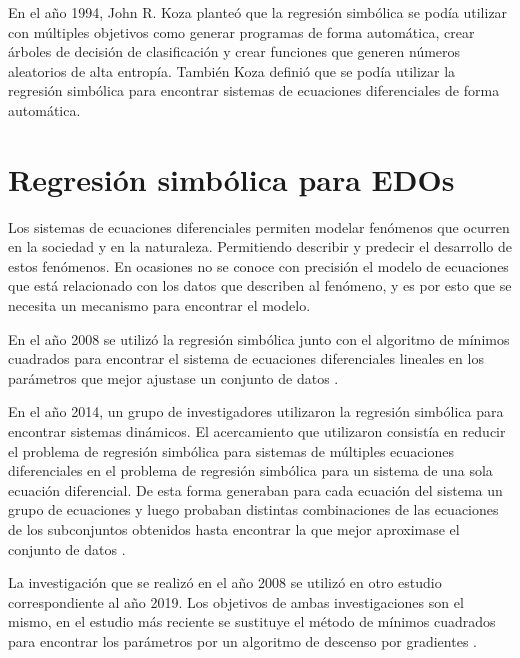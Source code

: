 En el año 1994, John R. Koza planteó que la regresión simbólica se podía utilizar con múltiples objetivos como generar programas de forma automática, crear árboles de decisión de clasificación y crear funciones que generen números aleatorios de alta entropía. También Koza definió que se podía utilizar la regresión simbólica para encontrar sistemas de ecuaciones diferenciales de forma automática.\cite{koza1994genetic}

\section{Regresión simbólica para EDOs}\label{section:symbolic_regression_in_does}

Los sistemas de ecuaciones diferenciales permiten modelar fenómenos que ocurren en la sociedad y en la naturaleza. Permitiendo describir y predecir el desarrollo de estos fenómenos. En ocasiones no se conoce con precisión el modelo de ecuaciones que está relacionado con los datos que describen al fenómeno, y es por esto que se necesita un mecanismo para encontrar el modelo.

En el año 2008 se utilizó la regresión simbólica junto con el algoritmo de mínimos cuadrados para encontrar el sistema de ecuaciones diferenciales lineales en los parámetros que mejor ajustase un conjunto de datos \cite{iba2008inference}.

En el año 2014, un grupo de investigadores utilizaron la regresión simbólica para encontrar sistemas dinámicos. El acercamiento que utilizaron consistía en reducir el problema de regresión simbólica para sistemas de múltiples ecuaciones diferenciales en el problema de regresión simbólica para un sistema de una sola ecuación diferencial. De esta forma generaban para cada ecuación del sistema un grupo de ecuaciones y luego probaban distintas combinaciones de las ecuaciones de los subconjuntos obtenidos hasta encontrar la que mejor aproximase el conjunto de datos \cite{gaucel2014learning}.

La investigación que se realizó en el año 2008 se utilizó en otro estudio correspondiente al año 2019. Los objetivos de ambas investigaciones son el mismo, en el estudio más reciente se sustituye el método de mínimos cuadrados para encontrar los parámetros por un algoritmo de descenso por gradientes \cite{kronberger2019identification}.



